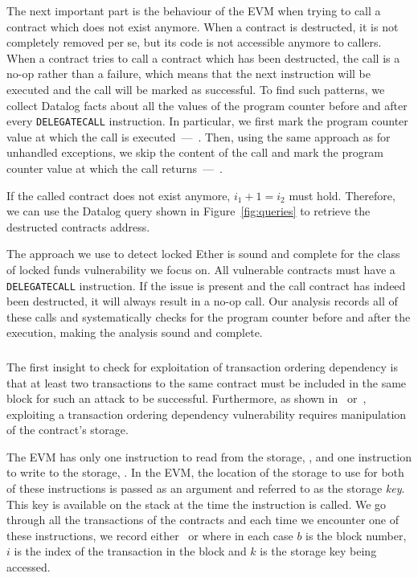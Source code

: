 The next important part is the behaviour of the EVM when trying to call a contract which does not exist anymore.
When a contract is destructed, it is not completely removed per se, but its code is not accessible anymore to callers.
When a contract tries to call a contract which has been destructed, the call is a no-op rather than a failure, which means that the next instruction will be executed and the call will be marked as successful.
To find such patterns, we collect Datalog facts about all the values of the program counter before and after every \lstinline{DELEGATECALL} instruction. In particular, we first mark the program counter value at which the call is executed~---~. Then, using the same approach as for unhandled exceptions, we skip the content of the call and mark the program counter value at which the call returns~---~.

If the called contract does not exist anymore, $i_1 + 1 = i_2$ must hold. Therefore, we can use the Datalog query shown in Figure~\ref{fig:queries} to retrieve the destructed contracts address.

\correctness The approach we use to detect locked Ether is sound and complete for the class of locked funds vulnerability we focus on. All vulnerable contracts must have a \lstinline{DELEGATECALL} instruction. If the issue is present and the call contract has indeed been destructed, it will always result in a no-op call. Our analysis records all of these calls and systematically checks for the program counter before and after the execution, making the analysis sound and complete.


\subsubsection{\transactionorder}
The first insight to check for exploitation of transaction ordering dependency is that at least two transactions to the same contract must be included in the same block for such an attack to be successful. Furthermore, as shown in~\cite{Luu2016a} or~\cite{Tsankov2018}, exploiting a transaction ordering dependency vulnerability requires manipulation of the contract's storage.

The EVM has only one instruction to read from the storage, , and one instruction to write to the storage, . In the EVM, the location of the storage to use for both of these instructions is passed as an argument and referred to as the storage \emph{key}. This key is available on the stack at the time the instruction is called. We go through all the transactions of the contracts and each time we encounter one of these instructions, we record either~ or  where in each case $b$ is the block number, $i$ is the index of the transaction in the block and $k$ is the storage key being accessed.

